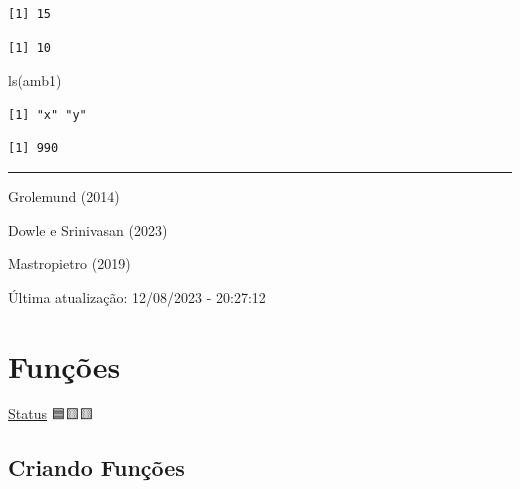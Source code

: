 \documentclass[
  letterpaper,
  DIV=11,
  numbers=noendperiod]{scrreprt}
\newenvironment{Shaded}{\begin{snugshade}}{\end{snugshade}}
\newcommand{\FunctionTok}[1]{\textcolor[rgb]{0.28,0.35,0.67}{#1}}
\newcommand{\NormalTok}[1]{\textcolor[rgb]{0.00,0.23,0.31}{#1}}
\newcommand{\SpecialCharTok}[1]{\textcolor[rgb]{0.37,0.37,0.37}{#1}}
\begin{document}
\begin{verbatim}
[1] 15
\end{verbatim}

\begin{Shaded}
\end{Shaded}

\begin{verbatim}
[1] 10
\end{verbatim}

\begin{Shaded}
\begin{Highlighting}[]
\FunctionTok{ls}\NormalTok{(amb1)}
\end{Highlighting}
\end{Shaded}

\begin{verbatim}
[1] "x" "y"
\end{verbatim}

\begin{Shaded}
\end{Shaded}

\begin{verbatim}
[1] 990
\end{verbatim}

\begin{center}\rule{0.5\linewidth}{0.5pt}\end{center}

Grolemund (2014)

Dowle e Srinivasan (2023)

Mastropietro (2019)

Última atualização: 12/08/2023 - 20:27:12

\hypertarget{funuxe7uxf5es}{%
\chapter{Funções}\label{funuxe7uxf5es}}

\protect\hyperlink{status-do-material}{Status} 🟦🟨🟨

\hypertarget{criando-funuxe7uxf5es}{%
\section{Criando Funções}\label{criando-funuxe7uxf5es}}
\end{document}
